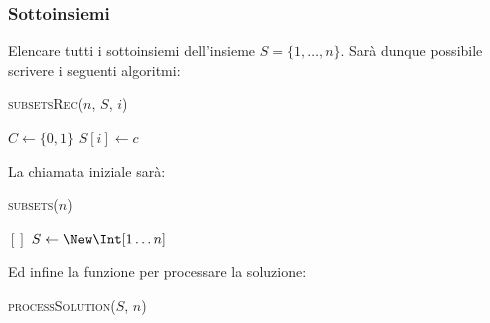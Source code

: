         \subsubsection{Sottoinsiemi}
            Elencare tutti i sottoinsiemi dell'insieme $S = \{1,\dots, n\}$.\newline
            Sarà dunque possibile scrivere i seguenti algoritmi:
            \begin{algorithm}[H]
                \caption{\textsc{subsetsRec}(\Int $n$, \Int[] $S$, \Int $i$)}
                \begin{algorithmic}
                     
                        \State {}
                    \Else {}
                        \State \Set $C \gets \{0, 1\}$
                            \State $S[i] \gets c$
                            \State {}
                        \EndFor
                    \EndIf
                \end{algorithmic}
            \end{algorithm}
            La chiamata iniziale sarà: 
            \begin{algorithm}[H]
                \caption{\textsc{subsets}(\Int $n$)}
                \begin{algorithmic}
                    \State \Int$[]$ $S \gets \New \Int[1\dots n]$
                    \State {}
                \end{algorithmic}
            \end{algorithm}
            Ed infine la funzione per processare la soluzione:
            \begin{algorithm}[H]
                \caption{\textsc{processSolution}(\Int[] $S$, \Int $n$)}
                \begin{algorithmic}
                    \State {}
                            \State {}
                        \EndIf
                    \EndFor
                    \State {}
                \end{algorithmic}
            \end{algorithm}

